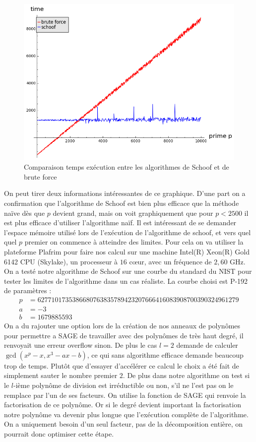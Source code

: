 \documentclass[12pt]{article}
\begin{document}
\begin{figure}[h!]
\caption{Comparaison temps exécution entre les algorithmes de Schoof et de brute force}
\includegraphics[scale=0.6]{pictures/schoof_vs_bruteforce.png} 
\end{figure}
On peut tirer deux informations intéressantes de ce graphique. D'une part on a confirmation que l'algorithme de Schoof est bien plus efficace que la méthode naïve dès que $p$ devient grand, mais on voit graphiquement que pour $p<2500$ il est plus efficace d'utiliser l'algorithme naïf.
\newline
Il est intéressant de se demander l'espace mémoire utilisé lors de l’exécution de l'algorithme de schoof, et vers quel quel $p$ premier on commence à atteindre des limites. Pour cela on va utiliser la plateforme Plafrim pour faire nos calcul sur une machine Intel(R) Xeon(R) Gold 6142 CPU (Skylake), un processeur à $16$ cœur, avec un fréquence de $2,60$ GHz. 
\newline
On a testé notre algorithme de Schoof sur une courbe du standard du NIST pour tester les limites de l'algorithme dans un cas réaliste. La courbe choisi est P-192 de paramètres :
\begin{align*}
p &= 6277101735386680763835789423207666416083908700390324961279\\
a &= -3 \\
b &= 1679885593
\end{align*}
On a du rajouter une option  lors de la création de nos anneaux de polynômes pour permettre a SAGE de travailler avec des polynômes de très haut degré, il renvoyait une erreur overflow sinon. De plus le cas $l=2$ demande de calculer  $\gcd(x^p -x, x^3 - ax -b)$, ce qui sans algorithme efficace demande beaucoup trop de temps. Plutôt que d'essayer d’accélérer ce calcul le choix a été fait de simplement sauter le nombre premier $2$. De plus dans notre algorithme on test si le $l$-ième polynôme de division est irréductible ou non, s'il ne l'est pas on le remplace par l'un de ses facteurs. On utilise la fonction de SAGE  qui renvoie la factorisation de ce polynôme. Or si le degré devient important la factorisation notre polynôme va devenir plus longue que l’exécution complète de l'algorithme. On a uniquement besoin d'un seul facteur, pas de la décomposition entière, on pourrait donc optimiser cette étape.
\end{document}
